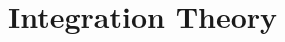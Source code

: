 \documentclass[../../main.tex]{subfiles}
\begin{document}
\chapter{Integration Theory}
\end{document}
